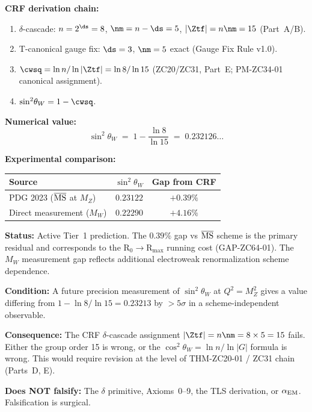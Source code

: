 \documentclass[12pt, a4paper]{article}
\renewcommand{\swsq}{\sin^2\!\theta_W}
\renewcommand{\aEM}{\alpha_{\rm EM}}
\begin{document}

\begin{predbox}[title={PRED-ZC64-01: $\swsq = 1 - \ln8/\ln15$
  (Tier~1, $R_0$)}]
\textbf{CRF derivation chain:}
\begin{enumerate}[leftmargin=2em, noitemsep]
  \item $\delta$-cascade: $n=2^{\ds}=8$, $\nm=n-\ds=5$,
    $|\Ztf|=n\nm=15$ (Part~A/B).
  \item T-canonical gauge fix: $\ds=3$, $\nm=5$ exact
    (Gauge Fix Rule v1.0).
  \item $\cwsq = \ln n/\ln|\Ztf| = \ln8/\ln15$
    (ZC20/ZC31, Part~E; PM-ZC34-01 canonical assignment).
  \item $\swsq = 1 - \cwsq$.
\end{enumerate}

\textbf{Numerical value:}
\[
  \swsq \;=\; 1 - \frac{\ln 8}{\ln 15}
  \;=\; 0.232126\ldots
\]

\textbf{Experimental comparison:}
\begin{center}
\begin{tabular}{@{}lcc@{}}
\toprule
Source & $\swsq$ & Gap from CRF \\
\midrule
PDG 2023 ($\overline{\rm MS}$ at $M_Z$) & $0.23122$ & $+0.39\%$ \\
Direct measurement ($M_W$) & $0.22290$ & $+4.16\%$ \\
\bottomrule
\end{tabular}
\end{center}

\textbf{Status:} Active Tier~1 prediction.
The $0.39\%$ gap vs $\overline{\rm MS}$ scheme is the
primary residual and corresponds to the R$_0\to$R$_{\max}$
running cost (GAP-ZC64-01).
The $M_W$ measurement gap reflects additional
electroweak renormalization scheme dependence.
\end{predbox}

\begin{fsbox}[title={FS-ZC64-01: Falsification of PRED-ZC64-01}]
\textbf{Condition:} A future precision measurement of
$\swsq$ at $Q^2 = M_Z^2$ gives a value differing from
$1-\ln8/\ln15 = 0.23213$ by $>\!5\sigma$
in a scheme-independent observable.

\textbf{Consequence:} The CRF $\delta$-cascade assignment
$|\Ztf| = n\nm = 8\times5 = 15$ fails.
Either the group order 15 is wrong, or the
$\cos^2\!\theta_W = \ln n/\ln|G|$ formula is wrong.
This would require revision at the level of
THM-ZC20-01 / ZC31 chain (Parts~D, E).

\textbf{Does NOT falsify:} The $\delta$ primitive,
Axioms~0--9, the TLS derivation, or $\aEM$.
Falsification is surgical.
\end{fsbox}
\end{document}
